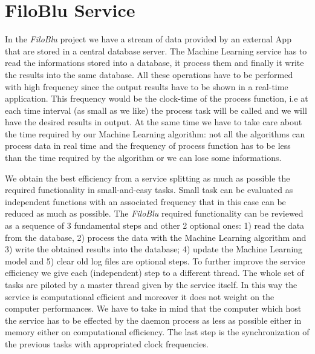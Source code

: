 \documentclass{standalone}
\begin{document}
\section*{FiloBlu Service}

In the \emph{FiloBlu} project we have a stream of data provided by an external App that are stored in a central database server.
The Machine Learning service has to read the informations stored into a database, it process them and finally it write the results into the same database.
All these operations have to be performed with high frequency since the output results have to be shown in a real-time application.
This frequency would be the clock-time of the process function, i.e at each time interval (as small as we like) the process task will be called and we will have the desired results in output.
At the same time we have to take care about the time required by our Machine Learning algorithm: not all the algorithms can process data in real time and the frequency of process function has to be less than the time required by the algorithm or we can lose some informations.

We obtain the best efficiency from a service splitting as much as possible the required functionality in small-and-easy tasks.
Small task can be evaluated as independent functions with an associated frequency that in this case can be reduced as much as possible.
The \emph{FiloBlu} required functionality can be reviewed as a sequence of 3 fundamental steps and other 2 optional ones: 1) read the data from the database, 2) process the data with the Machine Learning algorithm and 3) write the obtained results into the database; 4) update the Machine Learning model and 5) clear old log files are optional steps.
To further improve the service efficiency we give each (independent) step to a different thread.
The whole set of tasks are piloted by a master thread given by the service itself.
In this way the service is computational efficient and moreover it does not weight on the computer performances.
We have to take in mind that the computer which host the service has to be effected by the daemon process as less as possible either in memory either on computational efficiency.
The last step is the synchronization of the previous tasks with appropriated clock frequencies.
\end{document}
